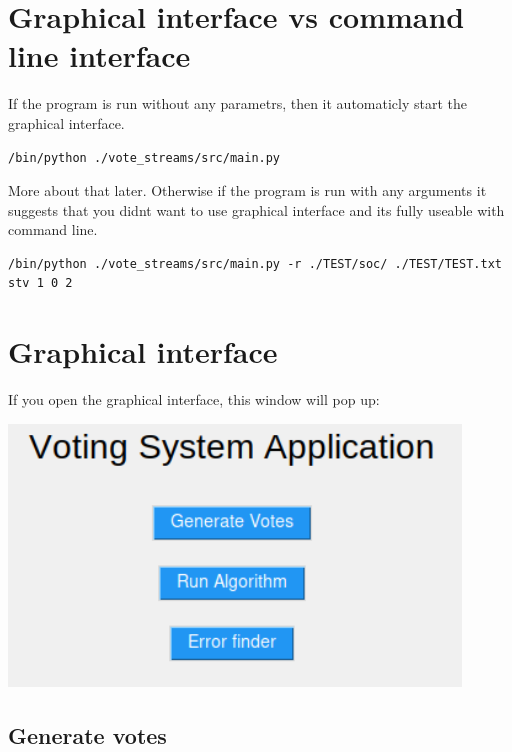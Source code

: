 \documentclass[a4paper,12pt]{report}
\begin{document}
	\pagestyle{toc}
	\tableofcontents
	\cleardoublepage
	\pagestyle{plain}
	\pagebreak

	\chapter{Graphical interface vs command line interface}
	
	If the program is run without any parametrs, then it automaticly start the graphical interface.
	
	\begin{lstlisting}
/bin/python ./vote_streams/src/main.py
	\end{lstlisting}
	
	More about that later. Otherwise if the program is run with any arguments it suggests that you didnt want to use graphical interface and its fully useable with command line.
	
	\begin{lstlisting}
/bin/python ./vote_streams/src/main.py -r ./TEST/soc/ ./TEST/TEST.txt stv 1 0 2
	\end{lstlisting}
	
	\chapter{Graphical interface}
	
	If you open the graphical interface, this window will pop up:
	
	\begin{center}
		\includegraphics[width=12cm]{user_interface_mane.png}
	\end{center}
	
	\section{Generate votes}
	
\end{document}
